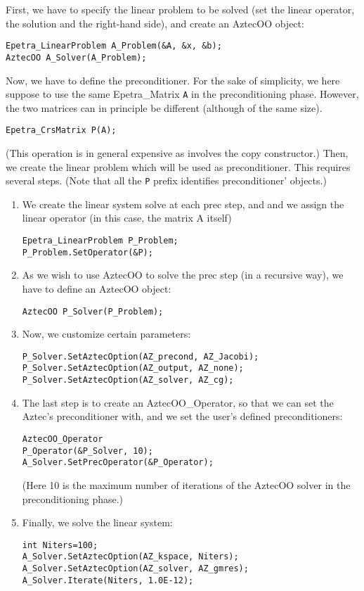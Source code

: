 First, we have to specify the linear problem to be solved (set the
linear operator, the solution and the right-hand side), and create an
AztecOO object:
\begin{verbatim}
Epetra_LinearProblem A_Problem(&A, &x, &b);
AztecOO A_Solver(A_Problem);
\end{verbatim}
Now, we have to define the preconditioner. For the sake of simplicity,
we here suppose to use the same Epetra\_Matrix \verb!A! in the
preconditioning phase. However, the two matrices can in principle be
different (although of the same size).
\begin{verbatim}
Epetra_CrsMatrix P(A);
\end{verbatim}
(This operation is in general expensive as involves the copy
constructor.)  Then, we create the linear problem which will be used as
preconditioner.  This requires several steps.  (Note that all the
\verb!P! prefix identifies preconditioner' objects.)
\begin{enumerate}
\item We create the linear system solve at each prec step, and and we
  assign the linear operator (in this case, the matrix A itself)
\begin{verbatim}
Epetra_LinearProblem P_Problem;
P_Problem.SetOperator(&P);
\end{verbatim}
\item As we wish to use AztecOO to solve the prec step (in a recursive
  way), we have to define an AztecOO object:
\begin{verbatim}
AztecOO P_Solver(P_Problem);  
\end{verbatim}
\item Now, we customize certain parameters:
\begin{verbatim}
P_Solver.SetAztecOption(AZ_precond, AZ_Jacobi);
P_Solver.SetAztecOption(AZ_output, AZ_none);
P_Solver.SetAztecOption(AZ_solver, AZ_cg);
\end{verbatim}
\item The last step is to create an AztecOO\_Operator, so that we can set
  the Aztec's preconditioner with, and we set the user's defined
  preconditioners:
\begin{verbatim}
AztecOO_Operator
P_Operator(&P_Solver, 10);  
A_Solver.SetPrecOperator(&P_Operator);
\end{verbatim}
(Here 10 is the maximum number of iterations of the AztecOO solver in
the preconditioning phase.)
\item Finally, we solve the linear system:
\begin{verbatim}
int Niters=100;
A_Solver.SetAztecOption(AZ_kspace, Niters);
A_Solver.SetAztecOption(AZ_solver, AZ_gmres);
A_Solver.Iterate(Niters, 1.0E-12);  
\end{verbatim}
\end{enumerate}


